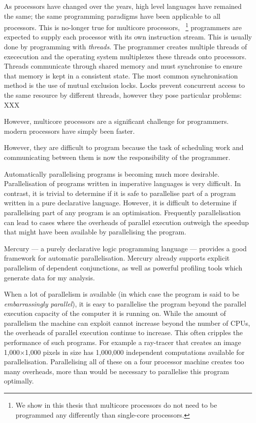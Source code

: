 
As processors have changed over the years,
high level languages have remained the same;
the same programming paradigms have been applicable to all processors.
This is no-longer true for multicore processors,~%
\footnote{We show in this thesis that multicore processors do not need to be
programmed any differently than single-core processors.}
programmers are expected to supply each processor with its own instruction
stream.
This is usually done by programming with \emph{threads}.
The programmer creates multiple threads of exececution and the operating system
multiplexes these threads onto processors.
Threads communicate through shared memory and must synchronise to ensure that
memory is kept in a consistent state.
The most common synchronisation method is the use of mutual exclusion locks.
Locks prevent concurrent access to the same resource by different threads,
however they pose particular problems: XXX



However, multicore processors are a significant challenge for programmers.
modern processors have simply been faster.



However, they are difficult to program because the task of scheduling work and
communicating between them is now the responsibility of the programmer.



Automatically parallelising programs is becoming much more desirable.
Parallelisation of programs written in imperative languages is very
difficult.  In contrast, it is trivial to determine if it is safe to
parallelise part of a program written in a pure declarative language.
However, it is difficult to determine if parallelising part of any
program is an optimisation.  Frequently parallelisation can lead to
cases where the overheads of parallel execution outweigh the speedup
that might have been available by parallelising the program.

Mercury --- a purely declarative logic programming language ---
provides a good framework for automatic parallelisation.  Mercury
already supports explicit parallelism of dependent conjunctions, as
well as powerful profiling tools which generate data for my analysis.

When a lot of parallelism is available (in which case the program is said to
be \emph{embarrassingly parallel}), it is easy to parallelise the
program beyond the parallel execution capacity of the computer it is
running on.
While the amount of parallelism the machine can exploit
cannot increase beyond the number of CPUs,
the overheads of parallel execution continue to increase.
This often cripples the performance of such programs.
For example a ray-tracer that creates an image
1,000$\times$1,000 pixels in size has 1,000,000 independent computations
available for parallelisation.
Parallelising all of these on a four processor machine creates too
many overheads, more than would be necessary to parallelise this program
optimally.


